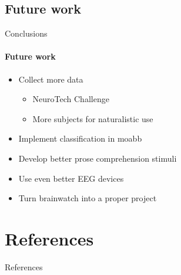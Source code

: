 \documentclass[xcolor={dvipsnames,table},12pt]{beamer}
\begin{document}
\subsection{Future work}
\begin{frame}{Conclusions}
    \framesubtitle{Future work}

    \begin{itemize}
        \item Collect more data
        \begin{itemize}
            \item NeuroTech Challenge
            \item More subjects for naturalistic use
        \end{itemize}
        \item Implement classification in moabb
        \item Develop better prose comprehension stimuli
        \item Use even better EEG devices
        \item Turn brainwatch into a proper project
    \end{itemize}
\end{frame}

\section*{References}
\begin{frame}[allowframebreaks]{References}
    \AtNextBibliography{\scriptsize}
    \printbibliography[category=cited]
\end{frame}
\end{document}
